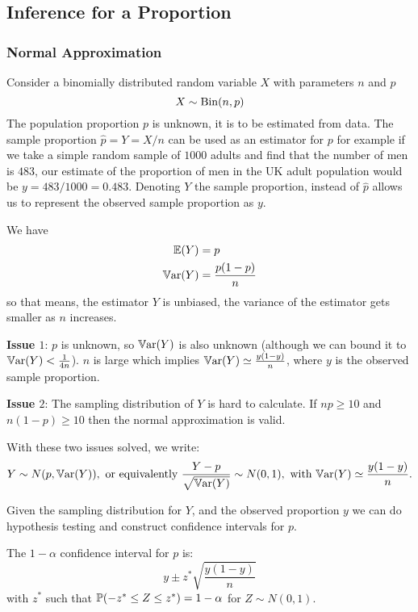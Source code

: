 \documentclass[10pt, a4paper]{article}
\begin{document}
\subsection{Inference for a Proportion}

\subsubsection{Normal Approximation}
Consider a binomially distributed random variable $X$ with parameters $n$ and $p$
\[
X \sim \Bin(n, p)
\]
The population proportion $p$ is unknown,
it is to be estimated from data.
The sample proportion $\hat{p} = Y = X / n$ can be used as an estimator for $p$ for example if we take a simple random sample of $1000$ adults and find that the number of men is $483$,
our estimate of the proportion of men in the UK adult population would be $y = 483 / 1000 = 0.483$.
Denoting $Y$ the sample proportion,
instead of $\hat{p}$ allows us to represent the observed sample proportion as $y$.

We have
\begin{align*}
    \E(Y) &= p \\
    \Var(Y) &= \frac{p(1 - p)}{n}
\end{align*}
so that means,
the estimator $Y$ is unbiased,
the variance of the estimator gets smaller as $n$ increases.

\textbf{Issue $1$}:
$p$ is unknown,
so $\Var(Y)$ is also unknown
(although we can bound it to $\Var(Y) < \frac{1}{4n}$).
$n$ is large which implies $\Var(Y) \simeq \frac{y(1 - y)}{n}$,
where $y$ is the observed sample proportion.

\textbf{Issue $2$}:
The sampling distribution of $Y$ is hard to calculate.
If $np \geq 10$ and $n(1 - p) \geq 10$ then the normal approximation is valid.

With these two issues solved,
we write:
\[
Y \sim N(p, \Var(Y)),\text{ or equivalently } \frac{Y - p}{\sqrt{\Var(Y)}} \sim N(0, 1),\text{ with } \Var(Y) \simeq \frac{y(1 - y)}{n}.
\]

Given the sampling distribution for $Y$,
and the observed proportion $y$ we can do hypothesis testing and construct confidence intervals for $p$.

The $1 - \alpha$ confidence interval for $p$ is:
\[
y \pm z ^ {*}\sqrt{\frac{y(1 - y)}{n}}
\]
with $z ^ {*}$ such that $\P(-z ^ {*} \leq Z \leq z ^ {*}) = 1 - \alpha$ for $Z \sim N(0, 1)$.
\end{document}
